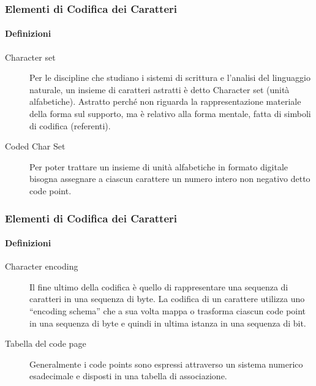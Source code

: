 \begin{frame}
	\frametitle{Elementi di Codifica dei Caratteri}
	\framesubtitle{Definizioni}
	\addtocounter{nframe}{1}


	\begin{description}
		\item [Character set] Per le discipline che studiano i sistemi di scrittura e l'analisi del linguaggio naturale, un insieme di caratteri astratti è detto Character set (unità alfabetiche). Astratto perché non riguarda la rappresentazione materiale della forma sul supporto, ma è relativo alla forma mentale, fatta di simboli di codifica (referenti).
		\item [Coded Char Set] Per poter trattare un insieme di unità alfabetiche in formato digitale bisogna assegnare a ciascun carattere un numero intero non negativo detto code point.
		
	\end{description}

\end{frame}

\begin{frame}
	\frametitle{Elementi di Codifica dei Caratteri}
	\framesubtitle{Definizioni}
	\addtocounter{nframe}{1}


	\begin{description}
		\item [Character encoding]  Il fine ultimo della codifica è quello di rappresentare una sequenza di caratteri in una sequenza di byte. La codifica di un carattere utilizza uno ``encoding schema'' che a sua volta mappa o trasforma ciascun code point in una sequenza di byte e quindi in ultima istanza in una sequenza di bit. 
		\item [Tabella del code page] Generalmente i code points sono espressi attraverso un sistema numerico esadecimale e disposti in una tabella di associazione.
	\end{description}

\end{frame}

